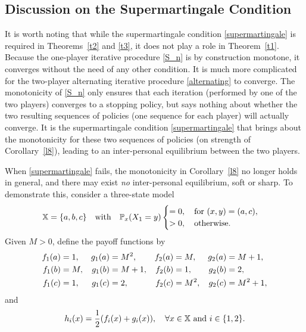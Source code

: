 \documentclass[11pt,reqno]{article}
\numberwithin{equation}{section}
\renewcommand{\P}{\mathbb{P}}
\newcommand{\X}{\mathbb{X}}
\begin{document}
\subsection{Discussion on the Supermartingale Condition}\label{subsec:supermartingale} 
It is worth noting that while the supermartingale condition \eqref{supermartingale} is required in Theorems~\ref{t2} and \ref{t3}, it does not play a role in Theorem~\ref{t1}. Because the one-player iterative procedure \eqref{S_n} is by construction monotone, it  converges without the need of any other condition. It is much more complicated for the two-player alternating iterative procedure \eqref{alternating} to converge. The monotonicity of \eqref{S_n} only ensures that each iteration (performed by one of the two players) converges to a stopping policy, but says nothing about whether the two resulting sequences of policies (one sequence for each player) will actually converge. It is the supermartingale condition \eqref{supermartingale} that brings about the monotonicity for these two sequences of policies (on strength of Corollary~\ref{l8}), leading to an inter-personal equilibrium between the two players. 

When \eqref{supermartingale} fails, the monotonicity in Corollary~\ref{l8} no longer holds in general, and there may exist {\it no} inter-personal equilibrium, soft or sharp. To demonstrate this, consider a three-state model
\begin{equation}\label{three state}
\X=\{a,b,c\}\quad \hbox{with}\quad \P_x(X_1=y)
\begin{cases}
=0,\quad \hbox{for}\ (x,y)=(a,c),\\
>0,\quad \hbox{otherwise}. %
\end{cases}
\end{equation}
Given $M>0$, define the payoff functions by
\begin{align}\label{f,g}
f_1(a)&=1,& g_1(a)&=M^2,& f_2(a)&=M,& g_2(a)&=M+1,\notag\\
f_1(b)&=M, & g_1(b)&=M+1,& f_2(b)&=1,& g_2(b)&=2,\\
f_1(c)&=1,& g_1(c)&=2,& f_2(c)&=M^2,& g_2(c)&=M^2+1,\notag
\end{align}
and
\begin{equation}\label{h}
h_i(x)=\frac{1}{2}(f_i(x)+g_i(x)),\quad \forall x\in\X\ \hbox{and}\ i\in\{1,2\}.
\end{equation}
\end{document}
